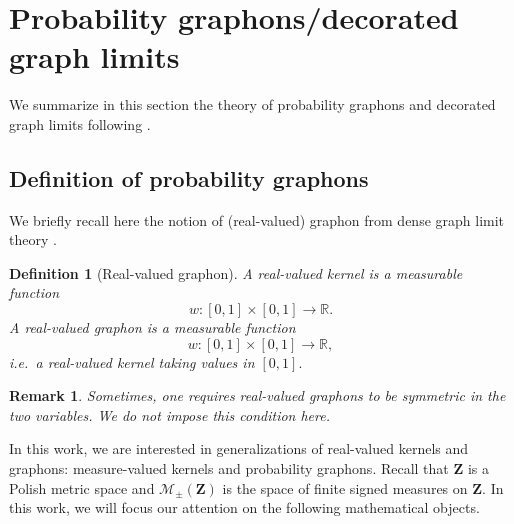 \documentclass[11pt]{article}
\newtheorem{definition}[theorem]{Definition}
\newtheorem{remark}[theorem]{Remark}
\def\R{\mathbb{R}}
\newcommand{\Space}{\mathbf{Z}}
\newcommand{\SignedMeas}{\mathcal{M}_{\pm}(\Space)}
\begin{document}
\section{Probability graphons/decorated graph limits}\label{Sec3ProbGraphon}

We summarize in this section the theory of probability graphons and decorated graph limits following \cite{abraham2023probabilitygraphons}. 
\subsection{Definition of probability graphons}\label{section_def_graphons}

We briefly recall here the notion of (real-valued) graphon from dense graph limit theory \cite{LovaszGraphLimits}.
\begin{definition}[Real-valued graphon]
    A \emph{real-valued kernel} is a measurable function
    $$w:[0,1]\times [0,1]\rightarrow \R.$$
    A \emph{real-valued graphon} is a measurable function
    $$w:[0,1]\times [0,1]\rightarrow \R,$$
    i.e.\ a real-valued kernel taking values in $[0,1].$ 
\end{definition}
\begin{remark}
Sometimes, one requires real-valued graphons to be symmetric in the two variables. We do not impose this condition here. 
\end{remark}

In this work, we are interested in generalizations of real-valued kernels and graphons: measure-valued kernels and probability graphons.
Recall that $\Space$ is a Polish metric space and $\SignedMeas$ is the space of finite signed measures on $\Space$. In this work, we will focus our attention on the following mathematical objects.
\end{document}
